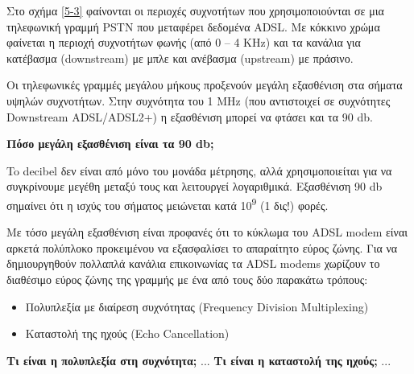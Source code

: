 Στο σχήμα \ref{5-3} φαίνονται οι περιοχές συχνοτήτων που χρησιμοποιούνται σε μια τηλεφωνική γραμμή PSTN που μεταφέρει δεδομένα ADSL. Με κόκκινο χρώμα φαίνεται η περιοχή συχνοτήτων φωνής (από 0 -- 4 KHz) και τα κανάλια για κατέβασμα (downstream) με μπλε και ανέβασμα (upstream) με πράσινο. 

Οι τηλεφωνικές γραμμές μεγάλου μήκους προξενούν μεγάλη εξασθένιση στα σήματα υψηλών συχνοτήτων. Στην συχνότητα του 1 MHz (που αντιστοιχεί σε συχνότητες Downstream ADSL/ADSL2+) η εξασθένιση μπορεί να φτάσει και τα 90 db.

\begin{inthebox}
\textbf{Πόσο μεγάλη εξασθένιση είναι τα 90 db;}

To decibel δεν είναι από μόνο του μονάδα μέτρησης, αλλά χρησιμοποιείται για να συγκρίνουμε μεγέθη μεταξύ τους και λειτουργεί λογαριθμικά. Εξασθένιση 90 db σημαίνει ότι η ισχύς του σήματος μειώνεται κατά 10\textsuperscript{9} (1 δις!) φορές.\\
\end{inthebox}

Με τόσο μεγάλη εξασθένιση είναι προφανές ότι το κύκλωμα του ADSL modem είναι αρκετά πολύπλοκο προκειμένου να εξασφαλίσει το απαραίτητο εύρος ζώνης. Για να δημιουργηθούν πολλαπλά κανάλια επικοινωνίας τα ADSL modems χωρίζουν το διαθέσιμο εύρος ζώνης της γραμμής με ένα από τους δύο παρακάτω τρόπους:

\begin{itemize}
\item Πολυπλεξία με διαίρεση συχνότητας (Frequency Division Multiplexing)
\item Καταστολή της ηχούς (Echo Cancellation)
\end{itemize}

\begin{inthebox}
\textbf{Τι είναι η πολυπλεξία στη συχνότητα;}
...
\textbf{Τι είναι η καταστολή της ηχούς;}
...
\end{inthebox}

